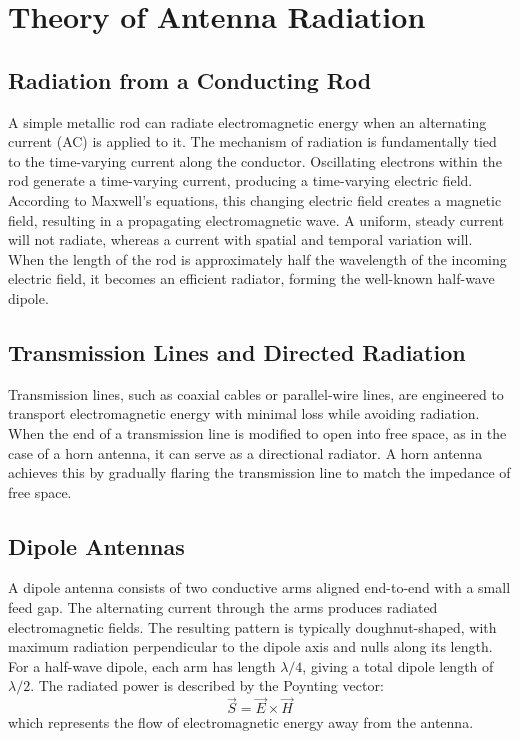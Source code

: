 \chapter{Theory of Antenna Radiation}

\section{Radiation from a Conducting Rod}

A simple metallic rod can radiate electromagnetic energy when an alternating current (AC) is applied to it. The mechanism of radiation is fundamentally tied to the time-varying current along the conductor. Oscillating electrons within the rod generate a time-varying current, producing a time-varying electric field. According to Maxwell’s equations, this changing electric field creates a magnetic field, resulting in a propagating electromagnetic wave. A uniform, steady current will not radiate, whereas a current with spatial and temporal variation will. When the length of the rod is approximately half the wavelength of the incoming electric field, it becomes an efficient radiator, forming the well-known half-wave dipole.

\section{Transmission Lines and Directed Radiation}

Transmission lines, such as coaxial cables or parallel-wire lines, are engineered to transport electromagnetic energy with minimal loss while avoiding radiation. When the end of a transmission line is modified to open into free space, as in the case of a horn antenna, it can serve as a directional radiator. A horn antenna achieves this by gradually flaring the transmission line to match the impedance of free space.

\section{Dipole Antennas}

A dipole antenna consists of two conductive arms aligned end-to-end with a small feed gap. The alternating current through the arms produces radiated electromagnetic fields. The resulting pattern is typically doughnut-shaped, with maximum radiation perpendicular to the dipole axis and nulls along its length. For a half-wave dipole, each arm has length $\lambda/4$, giving a total dipole length of $\lambda/2$. The radiated power is described by the Poynting vector:
\[
\vec{S} = \vec{E} \times \vec{H}
\]
which represents the flow of electromagnetic energy away from the antenna.

